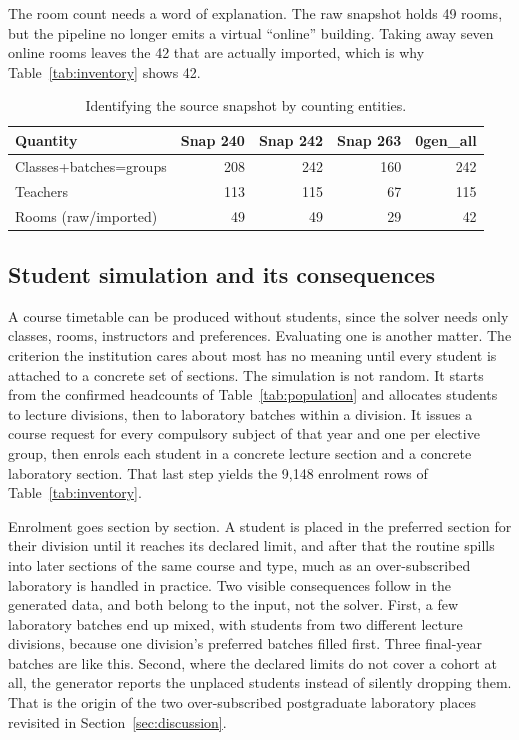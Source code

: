 \documentclass[journal]{IEEEtran}
\begin{document}
The room count needs a word of explanation. The raw snapshot holds 49 rooms, but the pipeline no longer emits a virtual ``online'' building. Taking away seven online rooms leaves the 42 that are actually imported, which is why Table~\ref{tab:inventory} shows 42.

\begin{table}[t]
\centering
\caption{Identifying the source snapshot by counting entities.}
\label{tab:snapshot}
\scriptsize
\begin{tabular}{@{}lrrrr@{}}
\toprule
Quantity & Snap 240 & Snap 242 & Snap 263 & 0gen\_all \\
\midrule
Classes+batches=groups & 208 & 242 & 160 & 242 \\
Teachers & 113 & 115 & 67 & 115 \\
Rooms (raw/imported) & 49 & 49 & 29 & 42 \\
\bottomrule
\end{tabular}
\end{table}

\subsection{Student simulation and its consequences}
A course timetable can be produced without students, since the solver needs only classes, rooms, instructors and preferences. Evaluating one is another matter. The criterion the institution cares about most has no meaning until every student is attached to a concrete set of sections. The simulation is not random. It starts from the confirmed headcounts of Table~\ref{tab:population} and allocates students to lecture divisions, then to laboratory batches within a division. It issues a course request for every compulsory subject of that year and one per elective group, then enrols each student in a concrete lecture section and a concrete laboratory section. That last step yields the 9{,}148 enrolment rows of Table~\ref{tab:inventory}.

Enrolment goes section by section. A student is placed in the preferred section for their division until it reaches its declared limit, and after that the routine spills into later sections of the same course and type, much as an over-subscribed laboratory is handled in practice. Two visible consequences follow in the generated data, and both belong to the input, not the solver. First, a few laboratory batches end up mixed, with students from two different lecture divisions, because one division's preferred batches filled first. Three final-year batches are like this. Second, where the declared limits do not cover a cohort at all, the generator reports the unplaced students instead of silently dropping them. That is the origin of the two over-subscribed postgraduate laboratory places revisited in Section~\ref{sec:discussion}.
\end{document}
